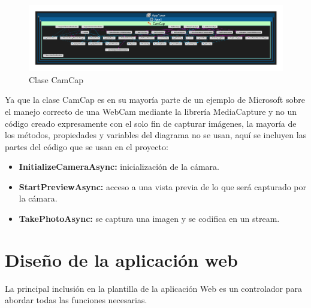 

\begin{figure}[!htbp]
	\centering
	\includegraphics[angle=90, scale=0.9]{fig/CamCap}
	\caption{Clase CamCap}
\end{figure}

\FloatBarrier

Ya que la clase CamCap es en su mayoría parte de un ejemplo de Microsoft sobre el manejo correcto de una WebCam mediante la librería MediaCapture y no un código creado expresamente con el solo fin de capturar imágenes, la mayoría de los métodos, propiedades y variables del diagrama no se usan, aquí se incluyen las partes del código que se usan en el proyecto:

\begin{itemize}

\item \textbf{InitializeCameraAsync:} inicialización de la cámara.



\item \textbf{StartPreviewAsync:} acceso a una vista previa de lo que será capturado por la cámara.



\item \textbf{TakePhotoAsync:} se captura una imagen y se codifica en un stream.



\end{itemize}

\section{Diseño de la aplicación web}

La principal inclusión en la plantilla de la aplicación Web es un controlador para abordar todas las funciones necesarias.

